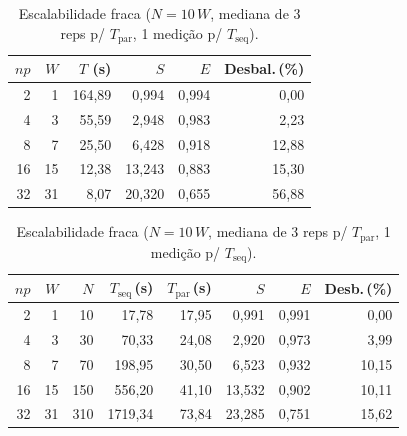 \documentclass[twocolumn,a4paper,10pt]{article}
\begin{document}
\begin{table}[h]
  \centering
  \small
  \begin{minipage}[t]{0.46\linewidth}
    \centering
    \caption{Escalabilidade forte (60 frames, mediana 
    de 3 reps). $T_{\text{seq}} = 163{,}91$\,s.}
    \label{tab:strong}
    \begin{tabular}{rrrrrr}
      \toprule
      $np$ & $W$ & $T$ (s) & $S$ & $E$ & Desbal.\,(\%) \\
      \midrule
      2  & 1  & 164{,}89 & 0{,}994 & 0{,}994 & 0{,}00  \\
      4  & 3  & 55{,}59  & 2{,}948 & 0{,}983 & 2{,}23  \\
      8  & 7  & 25{,}50  & 6{,}428 & 0{,}918 & 12{,}88 \\
      16 & 15 & 12{,}38  & 13{,}243 & 0{,}883 & 15{,}30 \\
      32 & 31 & 8{,}07   & 20{,}320 & 0{,}655 & 56{,}88 \\
      \bottomrule
    \end{tabular}
  \end{minipage}\hfill
  \begin{minipage}[t]{0.50\linewidth}
    \centering
    \caption{Escalabilidade fraca ($N = 10\,W$, mediana de 3 reps p/ $T_{\text{par}}$, 1 medição p/ $T_{\text{seq}}$).}
    \label{tab:weak}
    \begin{tabular}{rrrrrrrr}
      \toprule
      $np$ & $W$ & $N$ & $T_{\text{seq}}$\,(s) & $T_{\text{par}}$\,(s) & $S$ & $E$ & Desb.\,(\%) \\
      \midrule
      2  & 1  & 10  & 17{,}78  & 17{,}95 & 0{,}991  & 0{,}991 & 0{,}00 \\
      4  & 3  & 30  & 70{,}33  & 24{,}08 & 2{,}920  & 0{,}973 & 3{,}99 \\
      8  & 7  & 70  & 198{,}95 & 30{,}50 & 6{,}523  & 0{,}932 & 10{,}15 \\
      16 & 15 & 150 & 556{,}20 & 41{,}10 & 13{,}532 & 0{,}902 & 10{,}11 \\
      32 & 31 & 310 & 1719{,}34 & 73{,}84 & 23{,}285 & 0{,}751 & 15{,}62 \\
      \bottomrule
    \end{tabular}
  \end{minipage}
\end{table}
\end{document}

